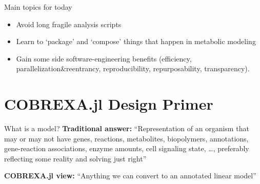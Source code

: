 \documentclass[aspectratio=169]{beamer}
\begin{document}
\begin{frame}{Main topics for today}
\begin{itemize}
\item Avoid long fragile analysis scripts
\item Learn to `package' and `compose' things that happen in metabolic modeling
\item Gain some side software-engineering benefits (efficiency, parallelization\&reentrancy, reproducibility, repurposability, transparency).
\end{itemize}
\end{frame}

\section{COBREXA.jl Design Primer}

\begin{frame}{What is a model?}
\textbf{Traditional answer:} ``Representation of an organism that may or may not have genes, reactions, metabolites, biopolymers, annotations, gene-reaction associations, enzyme amounts, cell signaling state, \dots, preferably reflecting some reality and solving just right''

\bigskip
\textbf{COBREXA.jl view:} ``Anything we can convert to an annotated linear model''
\end{frame}
\end{document}

